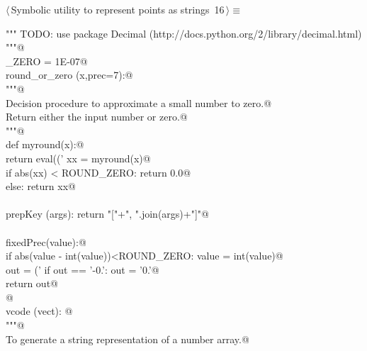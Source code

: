\documentclass[11pt,oneside]{article}	%
\begin{document}
\begin{flushleft} \small
\begin{minipage}{\linewidth} \label{scrap34}
\protect{}$\langle\,$Symbolic utility to represent points as strings\nobreak\ {\footnotesize 16}$\,\rangle\equiv$
\vspace{-1ex}
\begin{list}{}{} \item
\mbox{}\verb@""" TODO: use package Decimal (http://docs.python.org/2/library/decimal.html) """@\\
\mbox{}\verb@ROUND_ZERO = 1E-07@\\
\mbox{}\verb@def round_or_zero (x,prec=7):@\\
\mbox{}\verb@   """@\\
\mbox{}\verb@   Decision procedure to approximate a small number to zero.@\\
\mbox{}\verb@   Return either the input number or zero.@\\
\mbox{}\verb@   """@\\
\mbox{}\verb@   def myround(x):@\\
\mbox{}\verb@      return eval(('%.'+str(prec)+'f') % round(x,prec))@\\
\mbox{}\verb@   xx = myround(x)@\\
\mbox{}\verb@   if abs(xx) < ROUND_ZERO: return 0.0@\\
\mbox{}\verb@   else: return xx@\\
\mbox{}\verb@@\\
\mbox{}\verb@def prepKey (args): return "["+", ".join(args)+"]"@\\
\mbox{}\verb@@\\
\mbox{}\verb@def fixedPrec(value):@\\
\mbox{}\verb@   if abs(value - int(value))<ROUND_ZERO: value = int(value)@\\
\mbox{}\verb@   out = ('%0.7f'% value).rstrip('0')@\\
\mbox{}\verb@   if out == '-0.': out = '0.'@\\
\mbox{}\verb@   return out@\\
\mbox{}\verb@   @\\
\mbox{}\verb@def vcode (vect): @\\
\mbox{}\verb@   """@\\
\mbox{}\verb@   To generate a string representation of a number array.@\\

\end{list}
\end{minipage}
\end{flushleft}
\end{document}
